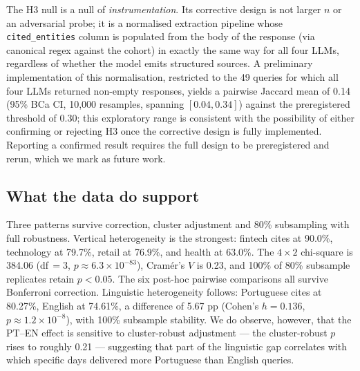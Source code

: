 \documentclass[preprint,12pt,authoryear]{elsarticle}
\begin{document}
\begin{table}[htbp]
\centering
\small
\caption{Cluster-robust standard-error inflation by collection day (12 clusters).}
\label{tab:cluster}
\end{table}

The H3 null is a null of \emph{instrumentation}. Its corrective design is not larger $n$ or an adversarial probe; it is a normalised extraction pipeline whose \texttt{cited\_entities} column is populated from the body of the response (via canonical regex against the cohort) in exactly the same way for all four LLMs, regardless of whether the model emits structured sources. A preliminary implementation of this normalisation, restricted to the 49 queries for which all four LLMs returned non-empty responses, yields a pairwise Jaccard mean of 0.14 (95\% BCa CI, 10{,}000 resamples, spanning $[0.04, 0.34]$) against the preregistered threshold of 0.30; this exploratory range is consistent with the possibility of either confirming or rejecting H3 once the corrective design is fully implemented. Reporting a confirmed result requires the full design to be preregistered and rerun, which we mark as future work.

\subsection{What the data do support}
Three patterns survive correction, cluster adjustment and 80\% subsampling with full robustness. Vertical heterogeneity is the strongest: fintech cites at 90.0\%, technology at 79.7\%, retail at 76.9\%, and health at 63.0\%. The $4\times 2$ chi-square is 384.06 (df\,$=3$, $p\approx 6.3\times 10^{-83}$), Cram\'er's $V$ is 0.23, and 100\% of 80\% subsample replicates retain $p<0.05$. The six post-hoc pairwise comparisons all survive Bonferroni correction. Linguistic heterogeneity follows: Portuguese cites at 80.27\%, English at 74.61\%, a difference of 5.67 pp (Cohen's $h=0.136$, $p\approx 1.2\times 10^{-8}$), with 100\% subsample stability. We do observe, however, that the PT--EN effect is sensitive to cluster-robust adjustment --- the cluster-robust $p$ rises to roughly 0.21 --- suggesting that part of the linguistic gap correlates with which specific days delivered more Portuguese than English queries.
\end{document}
